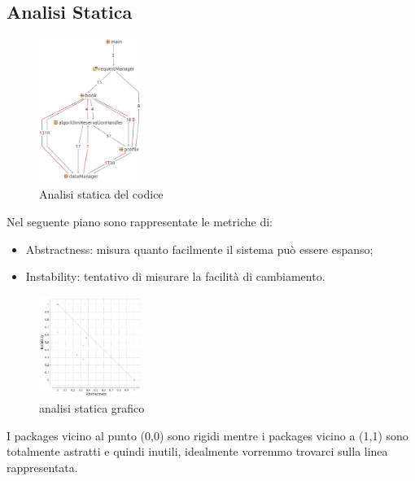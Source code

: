 		
	\subsection{Analisi Statica}
		\begin{figure}[h!]
			\centering
			\includegraphics[width=0.3\textwidth]{Immagini/analisi_statica_package.jpg}
			\caption{Analisi statica del codice}
			\label{fig:analisiStatica}
		\end{figure}
		
		
		Nel seguente piano sono rappresentate le metriche di:
		\begin{itemize}
			\item Abstractness: misura quanto facilmente il sistema può essere espanso;
			\item Instability: tentativo di misurare la facilità di cambiamento. 
		\end{itemize}
\newpage
	\begin{figure}[h!]
		\centering
		\includegraphics[width=0.3\textwidth]{Immagini/analisi_statica_grafico1.jpg}
		\caption{analisi statica grafico}
		\label{fig:analisiStaticaGrafico}
	\end{figure}		
I packages vicino al punto (0,0) sono rigidi mentre i packages vicino a (1,1) sono totalmente astratti e quindi inutili, idealmente vorremmo trovarci sulla linea rappresentata.
	
	
	
	
	
	
	
